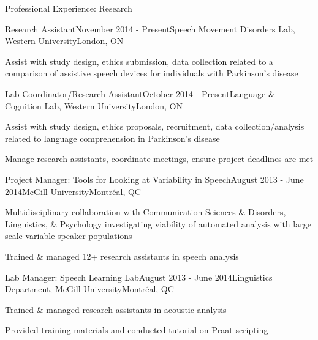 \documentclass{resume} %
\begin{document}
\begin{rSection}{Professional Experience: Research}

	\begin{rSubsection}{Research Assistant}{November 2014 - Present}{Speech Movement Disorders Lab, Western University}{London, ON}
	\item Assist with study design, ethics submission, data collection related to a comparison of assistive speech devices for individuals with Parkinson's disease
	\end{rSubsection}
	
	
	\begin{rSubsection}{Lab Coordinator/Research Assistant}{October 2014 - Present}{Language \& Cognition Lab, Western University}{London, ON}
	\item Assist with study design, ethics proposals, recruitment, data collection/analysis related to language comprehension in Parkinson's disease
	\item Manage research assistants, coordinate meetings, ensure project deadlines are met
	\end{rSubsection}
	
	
	\begin{rSubsection}{Project Manager: Tools for Looking at Variability in Speech}{August 2013 - June 2014}{McGill University}{Montr\'eal, QC}
	\item Multidisciplinary collaboration with Communication Sciences \& Disorders, Linguistics, \& Psychology investigating viability of automated analysis with large scale variable speaker populations
	\item Trained \& managed 12+ research assistants in speech analysis
	\end{rSubsection}
	
	
	\begin{rSubsection}{Lab Manager: Speech Learning Lab}{August 2013 - June 2014}{Linguistics Department, McGill University}{Montr\'eal, QC}
	\item Trained \& managed research assistants in acoustic analysis
	\item Provided training materials and conducted tutorial on Praat scripting
	\end{rSubsection}
	

\end{rSection}
\end{document}
